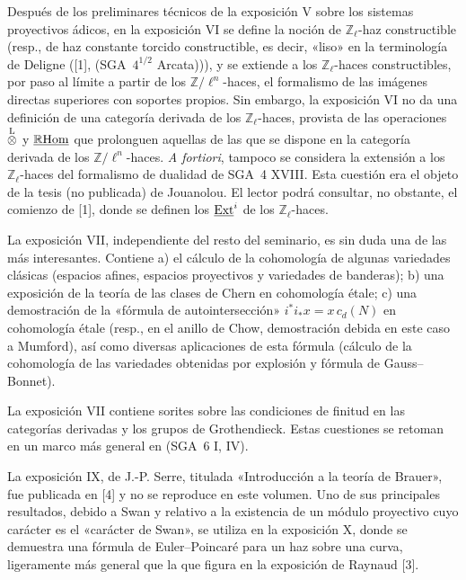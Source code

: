 Después de los preliminares técnicos de la exposición V sobre los sistemas proyectivos ádicos, en la exposición VI se define la noción de $\mathbb Z_\ell$-haz constructible (resp., de haz constante torcido constructible, es decir, «liso» en la terminología de Deligne ([1], (SGA~$4^{1/2}$ Arcata))), y se extiende a los $\mathbb Z_\ell$-haces constructibles, por paso al límite a partir de los $\mathbb Z/\ell^n$-haces, el formalismo de las imágenes directas superiores con soportes propios. Sin embargo, la exposición VI no da una definición de una categoría derivada de los $\mathbb Z_\ell$-haces, provista de las operaciones $\overset{\mathrm L}{\otimes}$ y $\underline{\mathbb{R}\mathrm{Hom}}$ que prolonguen aquellas de las que se dispone en la categoría derivada de los $\mathbb Z/\ell^n$-haces. \emph{A fortiori}, tampoco se considera la extensión a los $\mathbb Z_\ell$-haces del formalismo de dualidad de SGA~4 XVIII. Esta cuestión era el objeto de la tesis (no publicada) de Jouanolou. El lector podrá consultar, no obstante, el comienzo de [1], donde se definen los $\underline{\operatorname{Ext}}^i$ de los $\mathbb Z_\ell$-haces.

La exposición VII, independiente del resto del seminario, es sin duda una de las más interesantes. Contiene a) el cálculo de la cohomología de algunas variedades clásicas (espacios afines, espacios proyectivos y variedades de banderas); b) una exposición de la teoría de las clases de Chern en cohomología étale; c) una demostración de la «fórmula de autointersección» $i^*i_*x=x\,c_d(N)$ en cohomología étale (resp., en el anillo de Chow, demostración debida en este caso a Mumford), así como diversas aplicaciones de esta fórmula (cálculo de la cohomología de las variedades obtenidas por explosión y fórmula de Gauss--Bonnet).

La exposición VII contiene sorites sobre las condiciones de finitud en las categorías derivadas y los grupos de Grothendieck. Estas cuestiones se retoman en un marco más general en (SGA~6 I, IV).

La exposición IX, de J.-P. Serre, titulada «Introducción a la teoría de Brauer», fue publicada en [4] y no se reproduce en este volumen. Uno de sus principales resultados, debido a Swan y relativo a la existencia de un módulo proyectivo cuyo carácter es el «carácter de Swan», se utiliza en la exposición X, donde se demuestra una fórmula de Euler--Poincaré para un haz sobre una curva, ligeramente más general que la que figura en la exposición de Raynaud [3].

